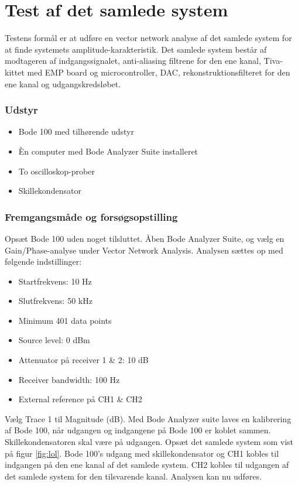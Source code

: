 \chapter{Test af det samlede system}
\label{bilag:test}
Testens formål er at udføre en vector network analyse af det samlede system for at finde systemets amplitude-karakteristik. 
Det samlede system består af modtageren af indgangssignalet, anti-aliasing filtrene for den ene kanal, Tiva-kittet med EMP board og microcontroller, DAC, rekonstruktionsfilteret for den ene kanal og udgangskredsløbet. 

\subsection{Udstyr}
\begin{itemize}
	\item Bode 100 med tilhørende udstyr
	\item Èn computer med Bode Analyzer Suite installeret
	\item To oscilloskop-prober
	\item Skillekondensator
\end{itemize}

\subsection{Fremgangsmåde og forsøgsopstilling}
Opsæt Bode 100 uden noget tilsluttet. 
Åben Bode Analyzer Suite, og vælg en Gain/Phase-analyse under Vector Network Analysis. 
Analysen sættes op med følgende indstillinger:
\begin{multicols}{2}
\begin{itemize}
	\item Startfrekvens: 10 Hz
	\item Slutfrekvens: 50 kHz
	\item Minimum 401 data points
	\item Source level: 0 dBm
	\item Attenuator på receiver 1 \& 2: 10 dB
	\item Receiver bandwidth: 100 Hz
	\item External reference på CH1 \& CH2
\end{itemize}
\end{multicols}
Vælg Trace 1 til Magnitude (dB). \newline
Med Bode Analyzer suite laves en kalibrering af Bode 100, når udgangen og indgangene på Bode 100 er koblet sammen. 
Skillekondensatoren skal være på udgangen. \newline
Opsæt det samlede system som vist på figur \ref{fig:lol}. 
Bode 100's udgang med skillekondensator og CH1 kobles til indgangen på den ene kanal af det samlede system. 
CH2 kobles til udgangen af det samlede system for den tilsvarende kanal. 
Analysen kan nu udføres. 

